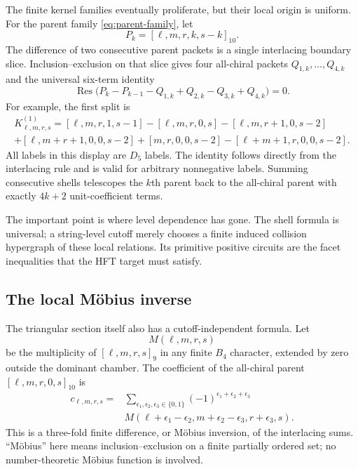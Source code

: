 \documentclass[11pt,a4paper]{article}
\theoremstyle{definition}
\newcommand{\Res}{\operatorname{Res}}
\begin{document}
The finite kernel families eventually proliferate, but their local origin is
uniform.  For the parent family \eqref{eq:parent-family}, let
\[
   P_k=[\ell,m,r,k,s-k]_{10}.
\]
The difference of two consecutive parent packets is a single interlacing
boundary slice.  Inclusion--exclusion on that slice gives four all-chiral
packets $Q_{1,k},\ldots,Q_{4,k}$ and the universal six-term identity
\begin{equation}
\label{eq:shell-identity}
   \Res\bigl(P_k-P_{k-1}-Q_{1,k}+Q_{2,k}-Q_{3,k}+Q_{4,k}\bigr)=0.
\end{equation}
For example, the first split is
\begin{multline}
 K_{\ell,m,r,s}^{(1)}=
 [\ell,m,r,1,s-1]-[\ell,m,r,0,s]
 -[\ell,m,r+1,0,s-2]\\
 +[\ell,m+r+1,0,0,s-2]
 +[m,r,0,0,s-2]-[\ell+m+1,r,0,0,s-2].
\end{multline}
All labels in this display are $D_5$ labels.  The identity follows directly
from the interlacing rule and is valid for arbitrary nonnegative labels.
Summing consecutive shells telescopes the $k$th parent back to the all-chiral
parent with exactly $4k+2$ unit-coefficient terms.

The important point is where level dependence has gone.  The shell formula
is universal; a string-level cutoff merely chooses a finite induced
collision hypergraph of these local relations.  Its primitive positive
circuits are the facet inequalities that the HFT target must satisfy.

\subsection{The local M\"obius inverse}

The triangular section itself also has a cutoff-independent formula.  Let
\[
   M(\ell,m,r,s)
\]
be the multiplicity of $[\ell,m,r,s]_9$ in any finite $B_4$ character,
extended by zero outside the dominant chamber.  The coefficient of the
all-chiral parent $[\ell,m,r,0,s]_{10}$ is
\begin{equation}
\label{eq:mobius}
\begin{split}
 c_{\ell,m,r,s}
 ={}&\sum_{\epsilon_1,\epsilon_2,\epsilon_3\in\{0,1\}}
 (-1)^{\epsilon_1+\epsilon_2+\epsilon_3}\\
 &M(\ell+\epsilon_1-\epsilon_2,
    m+\epsilon_2-\epsilon_3,
    r+\epsilon_3,s).
\end{split}
\end{equation}
This is a three-fold finite difference, or M\"obius inversion, of the
interlacing sums.  ``M\"obius'' here means inclusion--exclusion on a finite
partially ordered set; no number-theoretic M\"obius function is involved.
\end{document}
